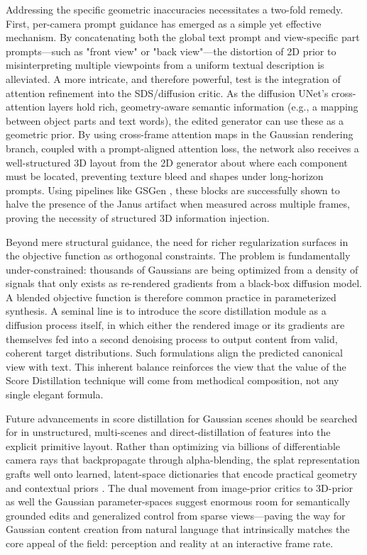\documentclass[11pt,a4paper]{article}
\begin{document}
Addressing the specific geometric inaccuracies necessitates a two-fold remedy. First, per-camera prompt guidance has emerged as a simple yet effective mechanism. By concatenating both the global text prompt and view-specific part prompts---such as "front view" or "back view"---the distortion of 2D prior to misinterpreting multiple viewpoints from a uniform textual description is alleviated. A more intricate, and therefore powerful, test is the integration of attention refinement into the SDS/diffusion critic. As the diffusion UNet's cross-attention layers hold rich, geometry-aware semantic information (e.g., a mapping between object parts and text words), the edited generator can use these as a geometric prior. By using cross-frame attention maps in the Gaussian rendering branch, coupled with a prompt-aligned attention loss, the network also receives a well-structured 3D layout from the 2D generator about where each component must be located, preventing texture bleed and shapes under long-horizon prompts. Using pipelines like GSGen \cite{arxiv:2309.16585v4}, these blocks are successfully shown to halve the presence of the Janus artifact when measured across multiple frames, proving the necessity of structured 3D information injection.

Beyond mere structural guidance, the need for richer regularization surfaces in the objective function as orthogonal constraints. The problem is fundamentally under-constrained: thousands of Gaussians are being optimized from a density of signals that only exists as re-rendered gradients from a black-box diffusion model. A blended objective function is therefore common practice in parameterized synthesis. A seminal line is to introduce the score distillation module as a diffusion process itself, in which either the rendered image or its gradients are themselves fed into a second denoising process to output content from valid, coherent target distributions. Such formulations align the predicted canonical view with text. This inherent balance reinforces the view that the value of the Score Distillation technique will come from methodical composition, not any single elegant formula.

Future advancements in score distillation for Gaussian scenes should be searched for in unstructured, multi-scenes and direct-distillation of features into the explicit primitive layout. Rather than optimizing via billions of differentiable camera rays that backpropagate through alpha-blending, the splat representation grafts well onto learned, latent-space dictionaries that encode practical geometry and contextual priors \cite{arxiv:2402.07181v1}. The dual movement from image-prior critics to 3D-prior as well the Gaussian parameter-spaces suggest enormous room for semantically grounded edits and generalized control from sparse views---paving the way for Gaussian content creation from natural language that intrinsically matches the core appeal of the field: perception and reality at an interactive frame rate.
\end{document}
